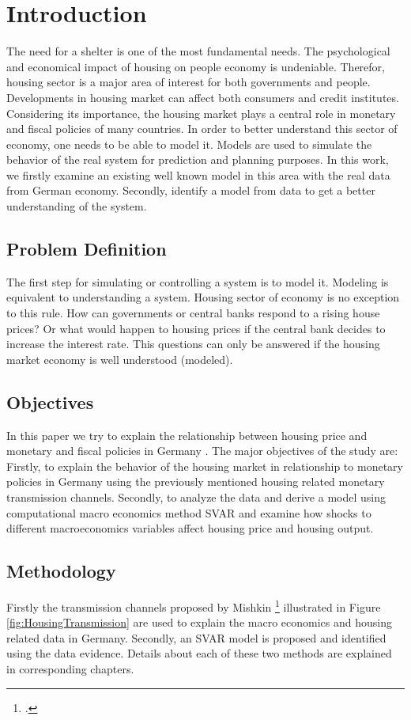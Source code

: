 \section{Introduction} \label{introduction}

The need for a shelter is one of the most fundamental needs. The psychological and economical impact of housing on people economy is undeniable. Therefor, housing sector is a major area of interest for both governments and people. Developments in housing market can affect both consumers and credit institutes. Considering its importance, the housing market plays a central role in monetary and fiscal policies of many countries. In order to better understand this sector of economy, one needs to be able to model it. Models are used to simulate the behavior of the real system for prediction and planning purposes. In this work, we firstly examine an existing well known model in this area with the real data from German economy. Secondly, identify a model from data to get a better understanding of the system.

\subsection{Problem Definition}
The first step for simulating or controlling a system is to model it. Modeling is equivalent to understanding a system. Housing sector of economy is no exception to this rule. How can governments or central banks respond to a rising house prices? Or what would happen to housing prices if the central bank decides to increase the interest rate. This questions can only be answered if the housing market economy is well understood (modeled). 


\subsection{Objectives}
In this paper we try to explain the relationship between housing price and monetary and fiscal policies in Germany .
The major objectives of the study are: Firstly, to explain the behavior of the housing market in relationship to monetary policies in Germany using the previously mentioned housing related monetary transmission channels. Secondly, to analyze the data and derive a model using computational macro economics method  \ac{SVAR} and examine how shocks to different macroeconomics variables affect housing price and housing output.

\subsection{Methodology}
Firstly the transmission channels proposed by Mishkin \footcite[See.][]{Mishkin2007} illustrated in Figure \ref{fig:HousingTransmission} are used to explain the macro economics and housing related data in Germany. Secondly, an \ac{SVAR} model is proposed and identified using the data evidence. Details about each of these two methods are explained in corresponding chapters.




